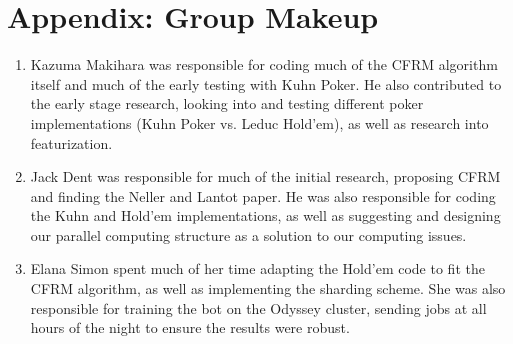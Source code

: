 \documentclass[11pt]{article}
\begin{document}
\section{Appendix: Group Makeup}
\begin{enumerate}
\item Kazuma Makihara was responsible for coding much of the CFRM algorithm itself and much of the early testing with Kuhn Poker. He also contributed to the early stage research, looking into and testing different poker implementations (Kuhn Poker vs. Leduc Hold'em), as well as research into featurization.

\item  Jack Dent was responsible for much of the initial research, proposing CFRM and finding the Neller and Lantot paper. He was also responsible for coding the Kuhn and Hold'em implementations, as well as suggesting and designing our parallel computing structure as a solution to our computing issues.

\item Elana Simon spent much of her time adapting the Hold'em code to fit the CFRM algorithm, as well as implementing the sharding scheme. She was also responsible for training the bot on the Odyssey cluster, sending jobs at all hours of the night to ensure the results were robust.

\end{enumerate}

\newpage

\nocite{*}
 

\end{document}
